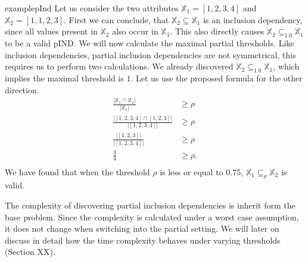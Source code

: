 \begin{restatable}{example}{pInd}\label{exmp:pInd}
    Let us consider the two attributes $\mathbb{X}_1 = [1, 2, 3, 4]$ and $\mathbb{X}_2 = [1, 1, 2, 3]$. First we can conclude, that $\mathbb{X}_2 \subseteq \mathbb{X}_1$ is an inclusion dependency, since all values present in $\mathbb{X}_2$ also occur in $\mathbb{X}_1$. This also directly causes $\mathbb{X}_2 \subseteq_{1.0} \mathbb{X}_1$ to be a valid pIND. We will now calculate the maximal partial thresholds. Like inclusion dependencies, partial inclusion dependencies are not symmetrical, this requires us to perform two calculations. We already discovered $\mathbb{X}_2 \subseteq_{1.0} \mathbb{X}_1$, which implies the maximal threshold is $1$. Let us use the proposed formula for the other direction.
    \begin{align*}
        \frac{|\mathbb{X}_1 \cap \mathbb{X}_2|}
            {|\mathbb{X}_1|} & \geq \rho \\
        \frac{|[1, 2, 3, 4] \cap [1, 2, 3]|}
            {|[1, 2, 3, 4]|} & \geq \rho \\ 
        \frac{|[1, 2, 3]|}
            {|[1, 2, 3, 4]|} & \geq \rho \\
        \frac{3}{4} & \geq \rho. \\ 
    \end{align*}
    We have found that when the threshold $\rho$ is less or equal to $0.75$, $\mathbb{X}_1 \subseteq_{\rho} \mathbb{X}_2$ is valid.
\end{restatable}

The complexity of discovering partial inclusion dependencies is inherit form the base problem. Since the complexity is calculated under a worst case assumption, it does not change when switching into the partial setting. We will later on discuss in detail how the time complexity behaves under varying thresholds (Section XX).  

